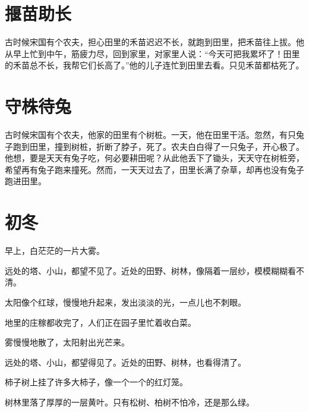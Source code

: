 \documentclass[12pt,UTF-8,openany]{ctexbook}
\begin{document}
\chapter{揠苗助长}

\begin{large}
    
    古时候宋国有个农夫，担心田里的禾苗迟迟不长，就跑到田里，把禾苗往上拔。他从早上忙到中午，筋疲力尽，回到家里，对家里人说：“今天可把我累坏了！田里的禾苗总不长，我帮它们长高了。”他的儿子连忙到田里去看。只见禾苗都枯死了。
    
\end{large}



\chapter{守株待兔}

\begin{large}
    
    古时候宋国有个农夫，他家的田里有个树桩。一天，他在田里干活。忽然，有只兔子跑到田里，撞到树桩，折断了脖子，死了。农夫白白得了一只兔子，开心极了。他想，要是天天有兔子吃，何必要耕田呢？从此他丢下了锄头，天天守在树桩旁，希望再有兔子跑来撞死。然而，一天天过去了，田里长满了杂草，却再也没有兔子跑进田里。
    
\end{large}



\chapter{初冬}

\begin{large}
    
    早上，白茫茫的一片大雾。
    
    远处的塔、小山，都望不见了。近处的田野、树林，像隔着一层纱，模模糊糊看不清。
    
    太阳像个红球，慢慢地升起来，发出淡淡的光，一点儿也不刺眼。
    
    地里的庄稼都收完了，人们正在园子里忙着收白菜。
    
    雾慢慢地散了，太阳射出光芒来。
    
    远处的塔、小山，都望得见了。近处的田野、树林，也看得清了。
    
    柿子树上挂了许多大柿子，像一个一个的红灯笼。
    
    树林里落了厚厚的一层黄叶。只有松树、柏树不怕冷，还是那么绿。
    
\end{large}
\end{document}
